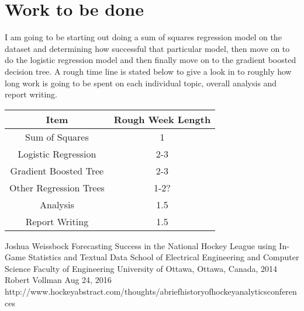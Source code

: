 \documentclass{article}
\begin{document}
	\section{Work to be done}
	I am going to be starting out doing a sum of squares regression model on the dataset and determining how successful that particular model, then move on to do the logistic regression model and then finally move on to the gradient boosted decision tree. A rough time line is stated below to give a look in to roughly how long work is going to be spent on each individual topic, overall analysis and report writing. 
			\begin{center}
			\begin{tabular}{|c |c|}
				\hline
				Item & Rough Week Length \\ 
				\hline
				Sum of Squares & 1 \\
				\hline
				Logistic Regression & 2-3 \\
				\hline
				Gradient Boosted Tree & 2-3 \\
				\hline
				Other Regression Trees & 1-2? \\
				\hline
				Analysis & 1.5 \\
				\hline
				Report Writing & 1.5 \\
				\hline
			\end{tabular}
		\end{center}
   
	
\newpage
\begin{thebibliography}{9}
	Joshua Weissbock Forecasting Success in the
	National Hockey League using
	In-Game Statistics and Textual Data School of Electrical Engineering and Computer Science
	Faculty of Engineering
	University of Ottawa,  Ottawa, Canada, 2014
	Robert Vollman Aug 24, 2016 \newline http://www.hockeyabstract.com/thoughts/abriefhistoryofhockeyanalyticsconferences
\end{thebibliography}
\end{document}
